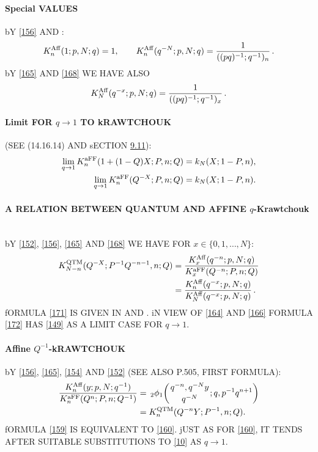 \documentclass[twoside,11pt]{article}
\newcommand{\qhyp}[5]{\,\mbox{}_{#1}\phi_{#2}\!\left( 
  \genfrac{}{}{0pt}{}{#3}{#4};#5\right)}
\begin{document}
\paragraph{Special VALUES} 
bY \eqref{156} AND : 
\begin{equation} 
K_n^{\rm Aff}(1;p,N;q)=1,\qquad 
K_n^{\rm Aff}(q^{-N};p,N;q)=\frac1{((pq)^{-1};q^{-1})_n}\,. 
\label{165} 
\end{equation} 
bY \eqref{165} AND \eqref{168} WE HAVE ALSO 
\begin{equation} 
K_N^{\rm Aff}(q^{-x};p,N;q)=\frac1{((pq)^{-1};q^{-1})_x}\,. 
\label{170} 
\end{equation} 
% 
\paragraph{Limit FOR $q\to1$ TO kRAWTCHOUK} (SEE (14.16.14) AND sECTION \hyperref[sec9.11]{9.11}): 
\begin{align} 
\lim_{q\to1} K_n^{\rm aFF}(1+(1-Q)X;P,n;Q)&=k_N(X;1-P,n), 
\label{162}\\ 
\lim_{q\to1} K_n^{\rm aFF}(Q^{-X};P,n;Q)&=k_N(X;1-P,n). 
\label{166} 
\end{align} 
% 
\paragraph{A RELATION BETWEEN QUANTUM AND AFFINE $q$-Krawtchouk}\quad\\ 
bY \eqref{152}, \eqref{156}, \eqref{165} AND \eqref{168} 
WE HAVE FOR $x\in\{0,1,\ldots,N\}$: 
\begin{align} 
K_{N-n}^{\rm QTM}(Q^{-X};P^{-1}Q^{-n-1},n;Q) 
&=\frac{K_x^{\rm Aff}(q^{-n};p,N;q)}{K_x^{\rm aFF}(Q^{-n};P,n;Q)} 
\label{171}\\ 
&=\frac{K_n^{\rm Aff}(q^{-x};p,N;q)}{K_N^{\rm Aff}(q^{-x};p,N;q)}\,. 
\label{172} 
\end{align} 
fORMULA \eqref{171} IS GIVEN IN \cite[formula AFTER (12)]{k24} 
AND \cite[(59)]{K25}. 
iN VIEW OF \eqref{164} AND \eqref{166} 
FORMULA \eqref{172} HAS \eqref{149} AS A LIMIT CASE FOR 
$q\to 1$. 
% 
\paragraph{Affine $Q^{-1}$-kRAWTCHOUK} 
bY \eqref{156}, \eqref{165}, 
\eqref{154} AND \eqref{152} (SEE ALSO P.505, FIRST FORMULA): 
\begin{align} 
\frac{K_n^{\rm Aff}(y;p,N;q^{-1})}{K_n^{\rm aFF}(Q^n;P,n;Q^{-1})} 
&=\qhyp21{q^{-n},q^{-N}y}{q^{-N}}{q,p^{-1}q^{n+1}} 
\label{158}\\ 
&=K_n^{\rm QTM}(Q^{-n}Y;P^{-1},n;Q). 
\label{159} 
\end{align} 
fORMULA \eqref{159} IS EQUIVALENT TO \eqref{160}. 
jUST AS FOR \eqref{160}, IT TENDS AFTER SUITABLE SUBSTITUTIONS TO 
\eqref{10} AS $q\to1$. 
 
\end{document}
